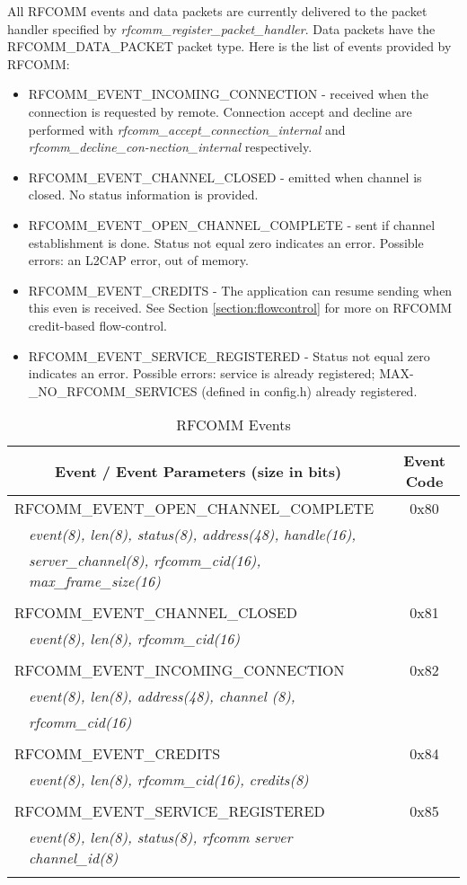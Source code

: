 All RFCOMM events and data packets are currently delivered to the packet handler specified by \emph{rfcomm\_register\_packet\_handler}. Data packets have the \mbox{RFCOMM}\_DATA\_PACKET packet type. Here is the list of events provided by RFCOMM:
\begin{itemize}
\item RFCOMM\_EVENT\_INCOMING\_CONNECTION - received when the connection is requested by remote. Connection accept and decline are performed with \emph{rfcomm\_accept\_connection\_internal} and \emph{rfcomm\_decline\_con-nection\_internal} respectively.
\item RFCOMM\_EVENT\_CHANNEL\_CLOSED - emitted when channel is closed. No status information is provided.
\item RFCOMM\_EVENT\_OPEN\_CHANNEL\_COMPLETE - sent if channel establishment is done. Status not equal zero indicates an error. Possible errors: an L2CAP error, out of memory.
\item RFCOMM\_EVENT\_CREDITS - The application can resume sending when this even is received. See Section \ref{section:flowcontrol} for more on RFCOMM credit-based flow-control.
\item RFCOMM\_EVENT\_SERVICE\_REGISTERED - Status not equal zero indicates an error. Possible errors: service is already registered; MAX-\_NO\_RFCOMM\_SERVICES (defined in config.h) already registered.
\end{itemize}

\begin{table*}[bp]
\caption{RFCOMM Events}
\begin{tabular}{p{1cm}p{10cm}c}\toprule
\multicolumn{2}{c}{Event / Event Parameters (size in bits)} & Event Code\\ 
\midrule

\multicolumn{2}{l}{RFCOMM\_EVENT\_OPEN\_CHANNEL\_COMPLETE} & 0x80\\
&\emph{event(8), len(8), status(8), address(48), handle(16), }\\
&\emph{server\_channel(8), rfcomm\_cid(16), max\_frame\_size(16)}\\
\\
\multicolumn{2}{l}{RFCOMM\_EVENT\_CHANNEL\_CLOSED} & 0x81\\
&\emph{event(8), len(8), rfcomm\_cid(16)}\\
\\
\multicolumn{2}{l}{RFCOMM\_EVENT\_INCOMING\_CONNECTION}& 0x82\\
&\emph{event(8), len(8), address(48), channel (8),} \\
& \emph{rfcomm\_cid(16)}\\
\\
\multicolumn{2}{l}{RFCOMM\_EVENT\_CREDITS} & 0x84\\
&\emph{event(8), len(8), rfcomm\_cid(16), credits(8)}\\
\\
\multicolumn{2}{l}{RFCOMM\_EVENT\_SERVICE\_REGISTERED} & 0x85\\
&\emph{event(8), len(8), status(8), rfcomm server channel\_id(8)}\\
\bottomrule
 \label{table:rfcommEvents}
\end{tabular}
\end{table*}


